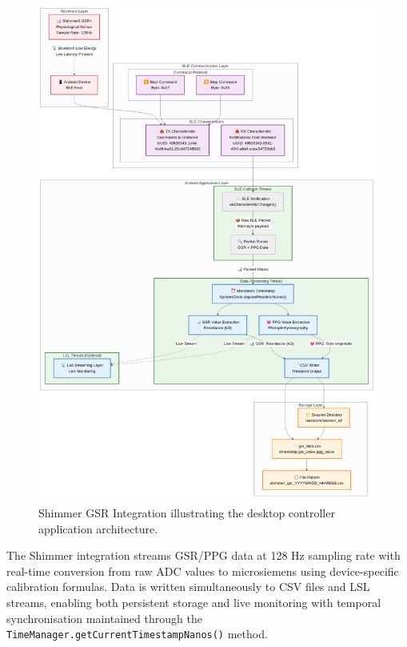 \begin{figure}[htbp]
  \centering
  \includegraphics[width=\textwidth]{../../diagrams/fig_4_03_shimmer_gsr_integration.png}
  \caption{Shimmer GSR Integration illustrating the desktop controller application architecture.}
  \label{fig:4_03_shimmer_gsr_integration}
\end{figure}

The Shimmer integration streams GSR/PPG data at 128 Hz sampling rate with real-time conversion from raw ADC values to microsiemens using device-specific calibration formulas. Data is written simultaneously to CSV files and LSL streams, enabling both persistent storage and live monitoring with temporal synchronisation maintained through the \texttt{TimeManager.getCurrentTimestampNanos()} method.

